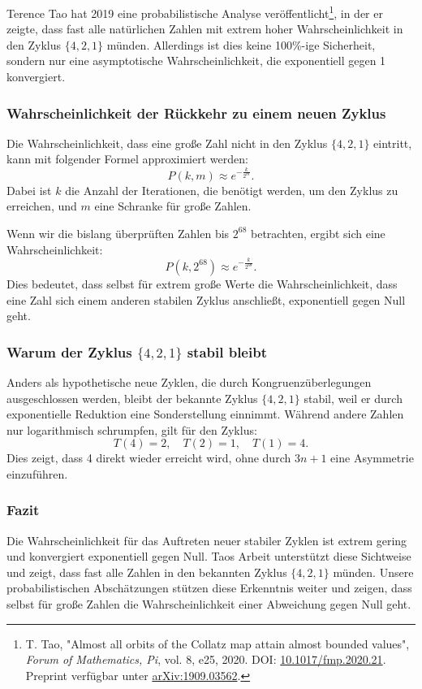 \documentclass[a4paper,12pt]{article}
\begin{document}
Terence Tao hat 2019 eine probabilistische Analyse veröffentlicht\footnote{T. Tao, "Almost all orbits of the Collatz map attain almost bounded values", \textit{Forum of Mathematics, Pi}, vol. 8, e25, 2020. DOI: \href{https://doi.org/10.1017/fmp.2020.21}{10.1017/fmp.2020.21}. Preprint verfügbar unter \href{https://arxiv.org/abs/1909.03562}{arXiv:1909.03562}.}, in der er zeigte, dass fast alle natürlichen Zahlen mit extrem hoher Wahrscheinlichkeit in den Zyklus \( \{4,2,1\} \) münden. Allerdings ist dies keine 100\%-ige Sicherheit, sondern nur eine asymptotische Wahrscheinlichkeit, die exponentiell gegen 1 konvergiert.

\subsubsection{Wahrscheinlichkeit der Rückkehr zu einem neuen Zyklus}

Die Wahrscheinlichkeit, dass eine große Zahl nicht in den Zyklus \( \{4,2,1\} \) eintritt, kann mit folgender Formel approximiert werden:
\[
P(k, m) \approx e^{-\frac{k}{2^m}}.
\]
Dabei ist \( k \) die Anzahl der Iterationen, die benötigt werden, um den Zyklus zu erreichen, und \( m \) eine Schranke für große Zahlen.

Wenn wir die bislang überprüften Zahlen bis \( 2^{68} \) betrachten, ergibt sich eine Wahrscheinlichkeit:
\[
P(k, 2^{68}) \approx e^{-\frac{k}{2^{68}}}.
\]
Dies bedeutet, dass selbst für extrem große Werte die Wahrscheinlichkeit, dass eine Zahl sich einem anderen stabilen Zyklus anschließt, exponentiell gegen Null geht.

\subsubsection{Warum der Zyklus \( \{4,2,1\} \) stabil bleibt}

Anders als hypothetische neue Zyklen, die durch Kongruenzüberlegungen ausgeschlossen werden, bleibt der bekannte Zyklus \( \{4,2,1\} \) stabil, weil er durch exponentielle Reduktion eine Sonderstellung einnimmt. Während andere Zahlen nur logarithmisch schrumpfen, gilt für den Zyklus:
\[
T(4) = 2, \quad T(2) = 1, \quad T(1) = 4.
\]
Dies zeigt, dass 4 direkt wieder erreicht wird, ohne durch \( 3n+1 \) eine Asymmetrie einzuführen.

\subsubsection{Fazit}
Die Wahrscheinlichkeit für das Auftreten neuer stabiler Zyklen ist extrem gering und konvergiert exponentiell gegen Null. Taos Arbeit unterstützt diese Sichtweise und zeigt, dass fast alle Zahlen in den bekannten Zyklus \( \{4,2,1\} \) münden. Unsere probabilistischen Abschätzungen stützen diese Erkenntnis weiter und zeigen, dass selbst für große Zahlen die Wahrscheinlichkeit einer Abweichung gegen Null geht.
\end{document}
